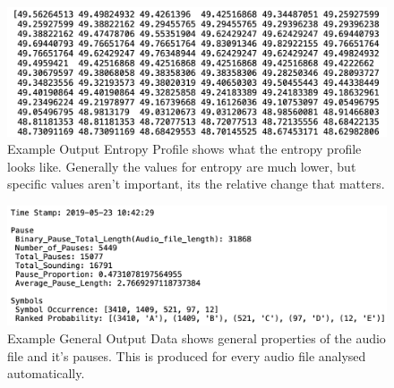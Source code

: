 \begin{figure}[h!]
	\center
	\includegraphics[scale=0.7]{src/main-matter/methodology/code-base/output/output_entropy}
	\caption{Example Output Entropy Profile shows what the entropy profile looks like. Generally the values for entropy are much lower, but specific values aren't important, its the relative change that matters.}
	\label{fig:processing}
\end{figure}

\begin{figure}[h!]
	\center
	\includegraphics[scale=0.6]{src/main-matter/methodology/code-base/output/output_data}
	\caption{Example General Output Data shows general properties of the audio file and it's pauses. This is produced for every audio file analysed automatically.}
	\label{fig:processing}
\end{figure}


\newpage

